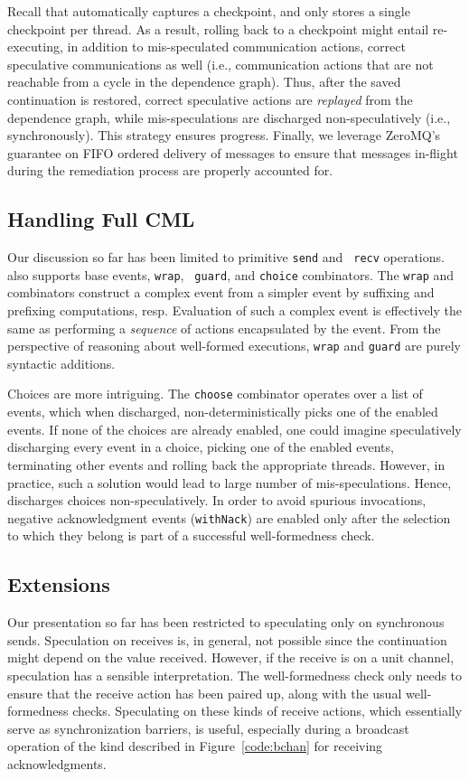 Recall that \rxcml automatically captures a checkpoint, and only stores a
single checkpoint per thread. As a result, rolling back to a checkpoint
might entail re-executing, in addition to mis-speculated communication
actions, correct speculative communications as well (i.e., communication
actions that are not reachable from a cycle in the dependence graph).  Thus,
after the saved continuation is restored, correct speculative actions are
\emph{replayed} from the dependence graph, while mis-speculations are
discharged non-speculatively (i.e., synchronously). This strategy ensures
progress. Finally, we leverage ZeroMQ's guarantee on FIFO ordered delivery of
messages to ensure that messages in-flight during the remediation process are
properly accounted for.

\subsection{Handling Full CML}

Our discussion so far has been limited to primitive {\tt send} and {\tt
recv} operations. \rxcml also supports base events, {\tt wrap}, {\tt
guard}, and {\tt choice} combinators.  The {\tt wrap} and 
combinators construct a complex event from a simpler event by suffixing and
prefixing computations, resp.  Evaluation of such a complex event is
effectively the same as performing a \emph{sequence} of actions encapsulated
by the event.  From the perspective of reasoning about well-formed
executions, {\tt wrap} and {\tt guard} are purely syntactic additions.

Choices are more intriguing. The {\tt choose} combinator operates over a list
of events, which when discharged, non-deterministically picks one of the
enabled events. If none of the choices are already enabled, one could imagine
speculatively discharging every event in a choice, picking one of the enabled
events, terminating other events and rolling back the appropriate threads.
However, in practice, such a solution would lead to large number of
mis-speculations. Hence, \rxcml discharges choices non-speculatively. In order
to avoid spurious invocations, negative acknowledgment events ({\tt withNack})
are enabled only after the selection to which they belong is part of a
successful well-formedness check.

\subsection{Extensions}
Our presentation so far has been restricted to speculating only on synchronous
sends. Speculation on receives is, in general, not possible since the
continuation might depend on the value received. However, if the receive is on
a unit channel, speculation has a sensible interpretation. The well-formedness
check only needs to ensure that the receive action has been paired up, along
with the usual well-formedness checks. Speculating on these kinds of receive
actions, which essentially serve as synchronization barriers, is useful,
especially during a broadcast operation of the kind described in
Figure~\ref{code:bchan} for receiving acknowledgments.

